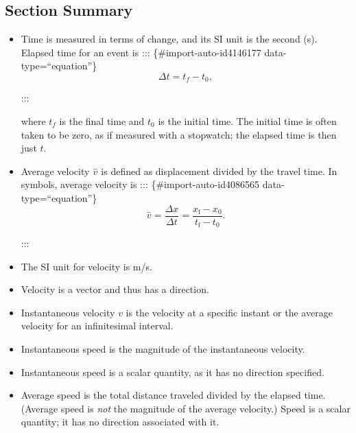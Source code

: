 \documentclass[
]{book}
\begin{document}
\hypertarget{fs-id1345097-summary}{}
\hypertarget{section-summary-2}{%
\subsection{Section Summary}\label{section-summary-2}}

\begin{itemize}
\item
  \protect\hypertarget{import-auto-id4070541}{}{Time is measured in terms of change, and its SI unit is the second
  (s). Elapsed time for an event is}
  ::: \{\#import-auto-id4146177 data-type=``equation''\}
  \[{\Delta t = {t_{f} - t_{0}},}{}\]

  :::

  where \(t_{f}{}\) is the final time and
  \emph{}\(t_{0}{}\) is the initial time. The
  initial time is often taken to be zero, as if measured with a
  stopwatch; the elapsed time is then just \(t{}\).
\item
  \protect\hypertarget{import-auto-id1770783}{}{Average velocity \(\overset{-}{v}{}\) is defined as displacement
  divided by the travel time. In symbols, average velocity
  is}
  ::: \{\#import-auto-id4086565 data-type=``equation''\}
  \[{{{\overset{-}{v} = \frac{\Delta x}{\Delta t}} = \frac{x_{\text{f}} - x_{0}}{t_{\text{f}} - t_{0}}}\text{.}}{}\]

  :::
\item
  \protect\hypertarget{import-auto-id1795857}{}{The SI unit for velocity is m/s.}
\item
  \protect\hypertarget{import-auto-id1795847}{}{Velocity is a vector and thus has a
  direction.}
\item
  \protect\hypertarget{import-auto-id4097170}{}{Instantaneous velocity \(v{}\) is the velocity at a specific instant
  or the average velocity for an infinitesimal
  interval.}
\item
  \protect\hypertarget{import-auto-id4097153}{}{Instantaneous speed is the magnitude of the instantaneous
  velocity.}
\item
  \protect\hypertarget{import-auto-id4097155}{}{Instantaneous speed is a scalar quantity, as it has no direction
  specified.}
\item
  \protect\hypertarget{import-auto-id4097159}{}{Average speed is the total distance traveled divided by the elapsed
  time. (Average speed is \emph{not} the magnitude of the average
  velocity.) Speed is a scalar quantity; it has no direction
  associated with it.}
\end{itemize}
\end{document}
